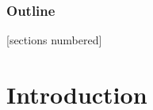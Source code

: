 
\begin{frame}[plain,label=titleframe]
  \maketitle
\end{frame}

\begin{frame}[fragile]
  \frametitle{Outline}
  [sections numbered]
  \tableofcontents[hideallsubsections]
\end{frame}

\section{Introduction}

